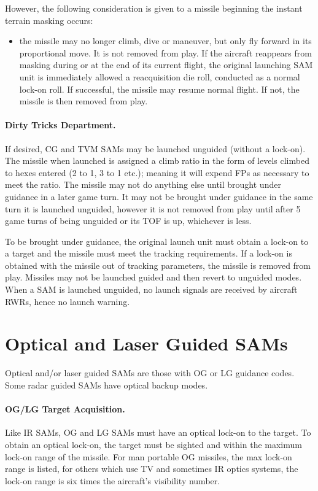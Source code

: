 However, the following consideration is given to a missile beginning the instant terrain masking occurs:

\begin{itemize}
    \item 
the missile may no longer climb, dive or maneuver, but only fly forward in its proportional move. It is not removed from play. If the aircraft reappears from masking during or at the end of its current flight, the original launching SAM unit is immediately allowed a reacquisition die roll, conducted as a normal lock-­on roll. If successful, the missile may resume normal flight. If not, the missile is then removed from play.
\end{itemize}

\paragraph{Dirty Tricks Department.} If desired, CG and TVM SAMs may be launched unguided (without a lock-on). The missile when launched is assigned a climb ratio in the form of levels climbed to hexes entered (2 to 1, 3 to 1 etc.); meaning it will expend FPs as necessary to meet the ratio. The missile may not do anything else until brought under guidance in a later game turn. It may not be brought under guidance in the same turn it is launched unguided, however it is not removed from play until after 5 game turns of being unguided or its TOF is up,  whichever is less.

To be brought under guidance, the original launch unit must obtain a lock-on to a target and the missile must meet the tracking requirements. If a lock-on is obtained with the missile out of tracking parameters, the missile is removed from play. Missiles may not be launched guided and then revert to unguided modes. When a SAM is launched unguided, no launch signals are received by aircraft RWRs, hence no launch warning.

\section{Optical and Laser Guided SAMs}

Optical and/or laser guided SAMs are those with OG or LG guidance codes. Some radar guided SAMs have optical back­up modes.

\paragraph{OG/LG Target Acquisition.} Like IR SAMs, OG and LG SAMs must have an optical lock-on to the target. To obtain an optical lock-on, the target must be sighted and within the maximum lock-on range of the missile. For man portable OG missiles, the max lock-on range is listed, for others which use TV and sometimes IR optics systems, the lock-on range is six times the aircraft's visibility number.

